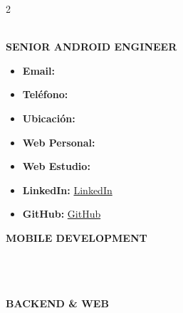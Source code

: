\documentclass[10pt,a4paper]{article}
\begin{document}
\begin{paracol}{2}

\begin{center}
  
  \vspace{1.0em}
  {\color{primary}\LARGE\bfseries \myname} \\[0.2em]
  {\color{accent}\small\bfseries SENIOR ANDROID ENGINEER}
\end{center}

\small
\begin{itemize}[label={}, leftmargin=0.2cm]
  \item \textbf{\color{accent}Email:} \href{mailto:\myemail}{\myemail}
  \item \textbf{\color{accent}Teléfono:} \href{tel:\myphone}{\myphone}
  \item \textbf{\color{accent}Ubicación:} \mylocation
  \item \textbf{\color{accent}Web Personal:} \href{https://\myweb}{\myweb}
  \item \textbf{\color{accent}Web Estudio:} \href{https://\mywebwalkiria}{\mywebwalkiria}
  \item \textbf{\color{accent}LinkedIn:} \href{https://\mylinkedin}{LinkedIn}
  \item \textbf{\color{accent}GitHub:} \href{https://\mygithub}{GitHub}
\end{itemize}

\textbf{\color{primary}\footnotesize MOBILE DEVELOPMENT} \\
   \\
   \\
   \\

\vspace{0.4em}
\textbf{\color{primary}\footnotesize BACKEND \& WEB} \\
   \\
   \\
  


\end{paracol}
\end{document}
